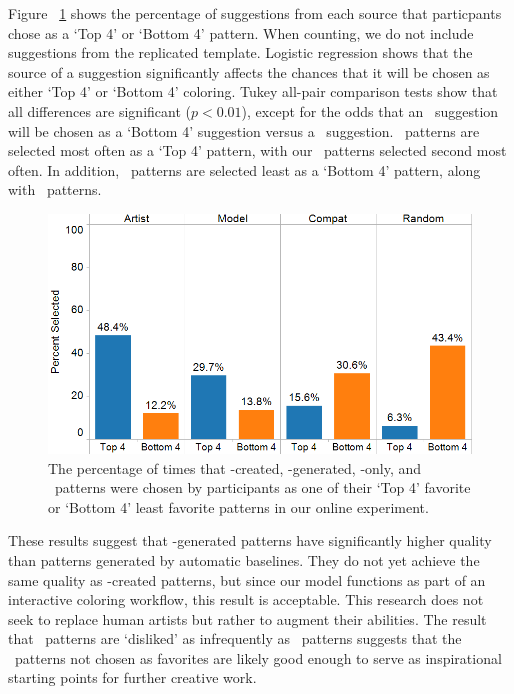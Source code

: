 Figure ~\ref{fig:study} shows the percentage of suggestions from each source that particpants chose as a `Top 4' or `Bottom 4' pattern. When counting, we do not include suggestions from the replicated template. Logistic regression shows that the source of a suggestion significantly affects the chances that it will be chosen as either `Top 4' or `Bottom 4' coloring. Tukey all-pair comparison tests show that all differences are significant ($p < 0.01$), except for the odds that an \artistSource~suggestion will be chosen as a `Bottom 4' suggestion versus a \modelSource~suggestion. \artistSource~patterns are selected most often as a `Top 4' pattern, with our \modelSource~patterns selected second most often. In addition, \modelSource~patterns are selected least as a `Bottom 4' pattern, along with \artistSource~patterns.

\begin{figure}[h!]
  \begin{center}
  \includegraphics[width=\columnwidth]{figs/evaluation.png}
	\end{center}
\caption{The percentage of times that \artistSource-created, \modelSource-generated, \compatSource-only, and \randomSource~patterns were chosen by participants as one of their `Top 4' favorite or `Bottom 4' least favorite patterns in our online experiment.}

 \label{fig:study}
\end{figure}

These results suggest that \modelSource-generated patterns have significantly higher quality than patterns generated by automatic baselines. They do not yet achieve the same quality as \artistSource-created patterns, but since our model functions as part of an interactive coloring workflow, this result is acceptable. This research does not seek to replace human artists but rather to augment their abilities. The result that \modelSource~patterns are `disliked' as infrequently as \artistSource~patterns suggests that the \modelSource~patterns not chosen as favorites are likely good enough to serve as inspirational starting points for further creative work.